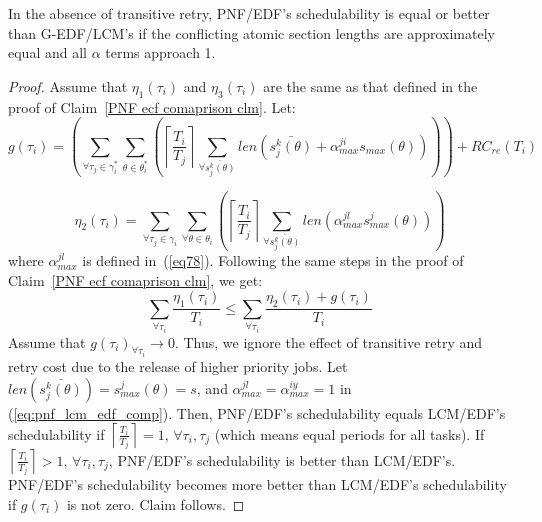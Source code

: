 \begin{clm}\label{sub:pnf_lcm_edf_comp}
In the absence of transitive retry, PNF/EDF's schedulability is equal or better than G-EDF/LCM's if the conflicting atomic section lengths are approximately equal and all $\alpha$ terms approach 1.

\end{clm}
\begin{proof}\normalfont
Assume that $\eta_{1}(\tau_i)$ and $\eta_{3}(\tau_i)$ are the same as that defined in the proof
of Claim~\ref{PNF ecf comaprison clm}. Let:
\begin{equation*}
g(\tau_{i}) = \left(\sum_{\forall\tau_{j}\in\gamma_{i}^{*}}\sum_{\theta\in\theta_{i}^{*}}\left(\left\lceil \frac{T_{i}}{T_{j}}\right\rceil \sum_{\forall\bar{s_{j}^{k}(\theta)}}len\left(\bar{s_{j}^{k}(\theta)} + \alpha_{max}^{ji}s_{max}(\theta)\right)\right)\right)+RC_{re}(T_{i})
\end{equation*}

\[
\eta_{2}(\tau_{i})=\sum_{\forall\tau_{j}\in\gamma_{i}}\sum_{\forall\theta\in\theta_{i}}\left(\left\lceil \frac{T_{i}}{T_{j}}\right\rceil \sum_{\forall\bar{s_{j}^{k}(\theta)}}len\left(\alpha_{max}^{jl}s_{max}^{j}(\theta)\right)\right)
\]
where $\alpha_{max}^{jl}$ is defined in~(\ref{eq78}). Following the same steps in the proof of Claim~\ref{PNF ecf comaprison clm}, we get:
\begin{equation}
\sum_{\forall\tau_{i}}\frac{\eta_{1}(\tau_{i})}{T_{i}}\le\sum_{\forall\tau_{i}}\frac{\eta_{2}(\tau_{i})+g(\tau_{i})}{T_{i}}\label{eq:pnf_lcm_edf_comp}
\end{equation}
Assume that $g(\tau_{i})_{\forall\tau_{i}}\rightarrow0$. Thus, we ignore the effect of transitive retry and retry cost due to the release of higher priority jobs. Let $len(\bar{s_{j}^{k}(\theta)})=s_{max}^{j}(\theta)=s$,
and $\alpha_{max}^{jl}=\alpha_{max}^{iy}=1$ in (\ref{eq:pnf_lcm_edf_comp}). Then, PNF/EDF's schedulability equals LCM/EDF's schedulability if
$\left\lceil \frac{T_{i}}{T_{j}}\right\rceil =1,\,\forall\tau_{i},\tau_{j}$
(which means equal periods for all tasks). If $\left\lceil \frac{T_{i}}{T_{j}}\right\rceil >1,\,\forall\tau_{i},\tau_{j}$,
PNF/EDF's schedulability is better than LCM/EDF's. PNF/EDF's schedulability  becomes more better than LCM/EDF's schedulability if $g(\tau_{i})$
is not zero. Claim follows.
\end{proof}

